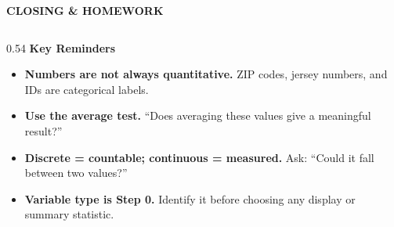 \documentclass[aspectratio=169, 11pt]{beamer}
\begin{document}
{
\begin{frame}[t, plain]
  \vspace{0.45cm}\par
  \hspace{0.55cm}%
  \begin{minipage}{0.9\textwidth}
    {\color{goldacc}\bfseries\footnotesize\MakeUppercase{Closing \& Homework}}
    \vspace{0.4cm}\par
    \begin{columns}[T]

      \begin{column}{0.54\textwidth}
        \small
        {\color{goldacc}\bfseries Key Reminders}\\[5pt]
        \begin{itemize}
          \setlength{\itemsep}{0.4em}\setlength{\topsep}{0em}
          \item {\color{white}\textbf{Numbers are not always quantitative.}
            {\color{skymid} ZIP codes, jersey numbers, and IDs are
            categorical labels.}}
          \item {\color{white}\textbf{Use the average test.}
            {\color{skymid} ``Does averaging these values give a
            meaningful result?''}}
          \item {\color{white}\textbf{Discrete = countable; continuous = measured.}
            {\color{skymid} Ask: ``Could it fall between two values?''}}
          \item {\color{white}\textbf{Variable type is Step 0.}
            {\color{skymid} Identify it before choosing any display
            or summary statistic.}}
        \end{itemize}
      \end{column}


\end{columns}
\end{minipage}
\end{frame}}
\end{document}
